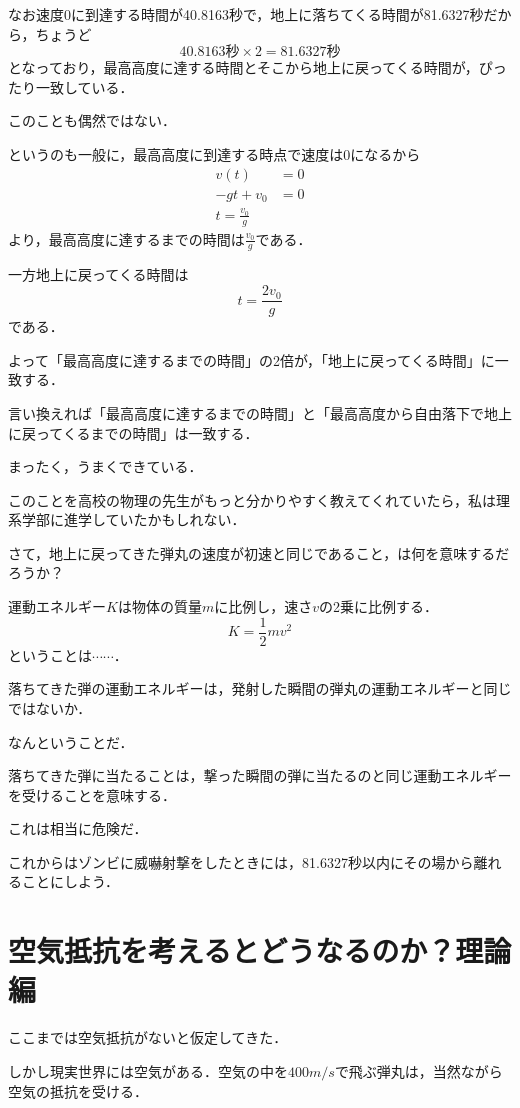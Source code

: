 \documentclass[a4paper,12pt]{jarticle}
\theoremstyle{definition}%
\begin{document}
なお速度0に到達する時間が40.8163秒で，地上に落ちてくる時間が81.6327秒だから，ちょうど
\[ 
40.8163秒 \times 2=81.6327秒
\]
となっており，最高高度に達する時間とそこから地上に戻ってくる時間が，ぴったり一致している．

このことも偶然ではない．

というのも一般に，最高高度に到達する時点で速度は0になるから
\begin{align*}
v(t)&=0   \\ 
-gt+v_0&=0\\
t=\frac{v_0}{g}   
\end{align*} 
より，最高高度に達するまでの時間は$\frac{v_0}{g}$である．

一方地上に戻ってくる時間は
\[ t=\frac{2v_0}{g}   
 \]
である．

よって「最高高度に達するまでの時間」の2倍が，「地上に戻ってくる時間」に一致する．

言い換えれば「最高高度に達するまでの時間」と「最高高度から自由落下で地上に戻ってくるまでの時間」は一致する．

まったく，うまくできている．

このことを高校の物理の先生がもっと分かりやすく教えてくれていたら，私は理系学部に進学していたかもしれない．


さて，地上に戻ってきた弾丸の速度が初速と同じであること，は何を意味するだろうか？

運動エネルギー$K$は物体の質量$m$に比例し，速さ$v$の2乗に比例する．
\[ 
K=\frac{1}{2}m v^2
\]
ということは$\cdots \cdots$．

落ちてきた弾の運動エネルギーは，発射した瞬間の弾丸の運動エネルギーと同じではないか．

なんということだ．

落ちてきた弾に当たることは，撃った瞬間の弾に当たるのと同じ運動エネルギーを受けることを意味する．

これは相当に危険だ．

これからはゾンビに威嚇射撃をしたときには，81.6327秒以内にその場から離れることにしよう．


\section{空気抵抗を考えるとどうなるのか？理論編}

ここまでは空気抵抗がないと仮定してきた．

しかし現実世界には空気がある．空気の中を$400m/s$で飛ぶ弾丸は，当然ながら空気の抵抗を受ける．
\end{document}
